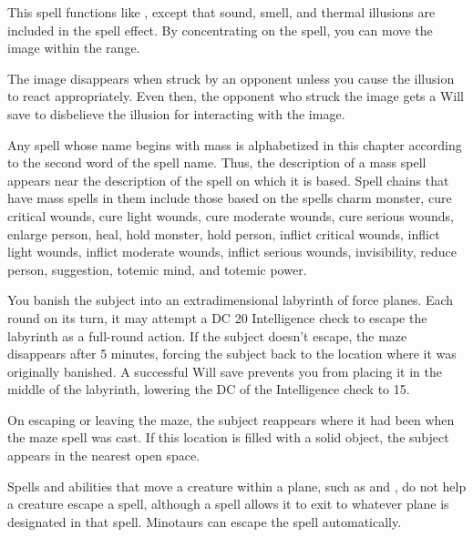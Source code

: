 \spellrng{\rngfar}
\spelldur{\durshort}
\begin{spelleffect}
  This spell functions like , except that sound, smell, and thermal illusions are included in the spell effect. By concentrating on the spell, you can move the image within the range.
\end{spelleffect}
\begin{spellnotes}
  The image disappears when struck by an opponent unless you cause the illusion to react appropriately. Even then, the opponent who struck the image gets a Will save to disbelieve the illusion for interacting with the image.
\end{spellnotes}

\par Any spell whose name begins with mass is alphabetized in this chapter according to the second word of the spell name. Thus, the description of a mass spell appears near the description of the spell on which it is based. Spell chains that have mass spells in them include those based on the spells charm monster, cure critical wounds, cure light wounds, cure moderate wounds, cure serious wounds, enlarge person, heal, hold monster, hold person, inflict critical wounds, inflict light wounds, inflict moderate wounds, inflict serious wounds, invisibility, reduce person, suggestion, totemic mind, and totemic power.

\spellrng{\rngclose}
\begin{spelleffect}
  You banish the subject into an extradimensional labyrinth of force planes. Each round on its turn, it may attempt a DC 20 Intelligence check to escape the labyrinth as a full-round action. If the subject doesn't escape, the maze disappears after 5 minutes, forcing the subject back to the location where it was originally banished. A successful Will save prevents you from placing it in the middle of the labyrinth, lowering the DC of the Intelligence check to 15.
  \par On escaping or leaving the maze, the subject reappears where it had been when the maze spell was cast. If this location is filled with a solid object, the subject appears in the nearest open space.
\end{spelleffect}
\begin{spellnotes}
  Spells and abilities that move a creature within a plane, such as  and , do not help a creature escape a  spell, although a  spell allows it to exit to whatever plane is designated in that spell. Minotaurs can escape the spell automatically.
\end{spellnotes}

